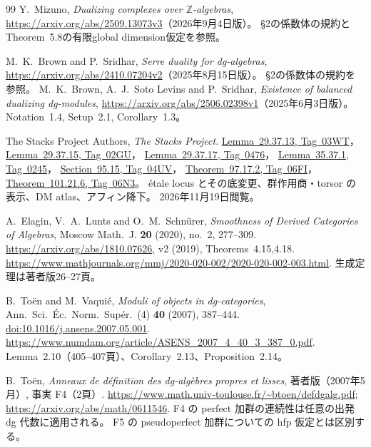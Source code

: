 \documentclass[11pt,a4paper]{ltjsarticle}
\numberwithin{equation}{section}
\begin{document}
\begin{thebibliography}{99}
Y.~Mizuno, \emph{Dualizing complexes over $\mathbb Z$-algebras},
\url{https://arxiv.org/abs/2509.13073v3}（2026年9月4日版）。
\S2の係数体の規約とTheorem~5.8の有限global dimension仮定を参照。

M.~K.~Brown and P.~Sridhar, \emph{Serre duality for dg-algebras},
\url{https://arxiv.org/abs/2410.07204v2}（2025年8月15日版）。
\S2の係数体の規約を参照。
M.~K.~Brown, A.~J.~Soto Levins and P.~Sridhar,
\emph{Existence of balanced dualizing dg-modules},
\url{https://arxiv.org/abs/2506.02398v1}（2025年6月3日版）。
Notation~1.4, Setup~2.1, Corollary~1.3。

The Stacks Project Authors, \emph{The Stacks Project}.
\href{https://stacks.math.columbia.edu/tag/03WT}{Lemma~29.37.13, Tag~03WT}，
\href{https://stacks.math.columbia.edu/tag/02GU}{Lemma~29.37.15, Tag~02GU}，
\href{https://stacks.math.columbia.edu/tag/0476}{Lemma~29.37.17, Tag~0476}，
\href{https://stacks.math.columbia.edu/tag/0245}{Lemma~35.37.1, Tag~0245}，
\href{https://stacks.math.columbia.edu/tag/04UV}{Section~95.15, Tag~04UV}，
\href{https://stacks.math.columbia.edu/tag/06FI}{Theorem~97.17.2, Tag~06FI}，
\href{https://stacks.math.columbia.edu/tag/06N3}{Theorem~101.21.6, Tag~06N3}。
étale locus とその底変更、群作用商・torsor の表示、DM atlas、アフィン降下。
2026年11月19日閲覧。

A.~Elagin, V.~A.~Lunts and O.~M.~Schn\"urer,
\emph{Smoothness of Derived Categories of Algebras},
Moscow Math.~J. \textbf{20} (2020), no.~2, 277--309.
\url{https://arxiv.org/abs/1810.07626}, v2 (2019), Theorems~4.15,4.18.
\url{https://www.mathjournals.org/mmj/2020-020-002/2020-020-002-003.html}.
生成定理は著者版26--27頁。

B.~To\"en and M.~Vaqui\'e,
\emph{Moduli of objects in dg-categories},
Ann.~Sci.~\'Ec.~Norm.~Sup\'er.~(4) \textbf{40} (2007), 387--444.
\href{https://doi.org/10.1016/j.ansens.2007.05.001}{doi:10.1016/j.ansens.2007.05.001}.
\url{https://www.numdam.org/article/ASENS_2007_4_40_3_387_0.pdf}.
Lemma~2.10（405--407頁）、Corollary~2.13、Proposition~2.14。

B.~To\"en,
\emph{Anneaux de d\'efinition des dg-alg\`ebres propres et lisses},
著者版（2007年5月）, 事実 F4（2頁）.
\url{https://www.math.univ-toulouse.fr/~btoen/defdgalg.pdf};
\url{https://arxiv.org/abs/math/0611546}.
F4 の perfect 加群の連続性は任意の出発 dg 代数に適用される。
F5 の pseudoperfect 加群についての hfp 仮定とは区別する。


\end{thebibliography}
\end{document}

